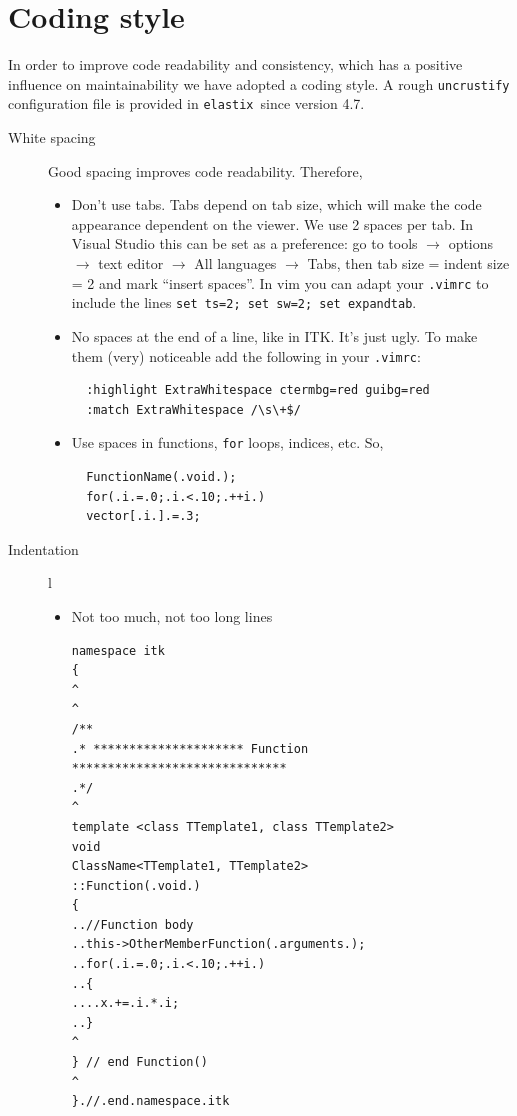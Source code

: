\documentclass[]{report}
\newcommand{\elastix}{\texttt{elastix}}
\begin{document}
\section{Coding style}\label{sec:dev:style}

In order to improve code readability and consistency, which has a
positive influence on maintainability we have adopted a coding
style. A rough \texttt{uncrustify} configuration file is provided in
\elastix\ since version 4.7.

\begin{description}
\item[White spacing] Good spacing improves code readability. Therefore,

\begin{itemize}
\item Don't use tabs. Tabs depend on tab size, which will make the
code appearance dependent on the viewer. We use 2 spaces per tab. In
Visual Studio this can be set as a preference: go to tools
$\rightarrow$ options $\rightarrow$ text editor $\rightarrow$ All
languages $\rightarrow$ Tabs, then tab size = indent size = 2 and
mark ``insert spaces''. In vim you can adapt your \texttt{.vimrc} to include
the lines \texttt{set ts=2; set sw=2; set expandtab}.

\item No spaces at the end of a line, like in ITK. It's just ugly. To
make them (very) noticeable add the following in your \texttt{.vimrc}:
\begin{verbatim}
  :highlight ExtraWhitespace ctermbg=red guibg=red
  :match ExtraWhitespace /\s\+$/
\end{verbatim}

\item Use spaces in functions, \texttt{for} loops, indices, etc. So,
\begin{verbatim}
  FunctionName(.void.);
  for(.i.=.0;.i.<.10;.++i.)
  vector[.i.].=.3;
\end{verbatim}
\end{itemize}

\item[Indentation] l

\begin{itemize}
\item Not too much, not too long lines
\begin{verbatim}
namespace itk
{
^
^
/**
.* ********************* Function ******************************
.*/
^
template <class TTemplate1, class TTemplate2>
void
ClassName<TTemplate1, TTemplate2>
::Function(.void.)
{
..//Function body
..this->OtherMemberFunction(.arguments.);
..for(.i.=.0;.i.<.10;.++i.)
..{
....x.+=.i.*.i;
..}
^
} // end Function()
^
}.//.end.namespace.itk
\end{verbatim}


\end{itemize}
\end{description}
\end{document}
